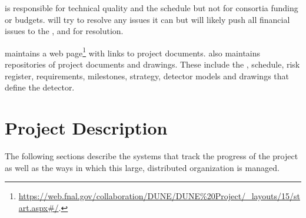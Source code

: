  is responsible for technical quality and the schedule but
not for consortia funding or budgets.   will try to resolve
any issues it can but will likely push all financial issues to the
,  and  for resolution.

 maintains a web
page\footnote{\url{https://web.fnal.gov/collaboration/DUNE/DUNE\%20Project/\_layouts/15/start.aspx\#/}.}
with links to project documents.  also maintains
repositories of project documents and drawings. These include the
, schedule, risk register, requirements, milestones,
strategy, detector models and drawings that define the 
detector.

\section{ Project Description}

The following sections describe the systems that track the progress of
the  project as well as the ways in which this large,
distributed organization is managed.

